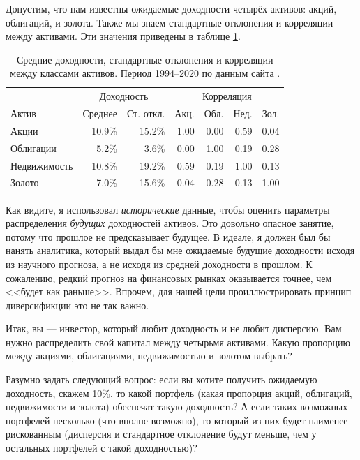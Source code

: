 Допустим, что нам известны ожидаемые доходности четырёх активов: акций, облигаций,  и золота. Также мы знаем стандартные отклонения и корреляции между активами. Эти значения приведены в таблице \ref{asset_class_returns_table}.

\begin{table}[h!]
\centering
\begin{tabular}{l|r|r|r|r|r|r}
 & \multicolumn{2}{c|}{Доходность} & \multicolumn{4}{c}{Корреляция} \\ \cline{2-7}
Актив        & Среднее & Ст. откл. & Акц. & Обл. & Нед. & Зол. \\ \hline
Акции        & 10.9\%  & 15.2\%    & 1.00  & 0.00   & 0.59    & 0.04 \\
Облигации    & 5.2\%   & 3.6\%     & 0.00  & 1.00   & 0.19    & 0.28 \\
Недвижимость & 10.8\%  & 19.2\%    & 0.59  & 0.19   & 1.00    & 0.13 \\
Золото       & 7.0\%   & 15.6\%    & 0.04  & 0.28   & 0.13    & 1.00
\end{tabular}
\caption{Средние доходности, стандартные отклонения и корреляции между классами активов. Период 1994--2020 по данным сайта .}
\label{asset_class_returns_table}
\end{table}

Как видите, я использовал \emph{исторические} данные, чтобы оценить параметры распределения \emph{будущих} доходностей активов. Это довольно опасное занятие, потому что прошлое не предсказывает будущее. В идеале, я должен был бы нанять аналитика, который выдал бы мне ожидаемые будущие доходности исходя из научного прогноза, а не исходя из средней доходности в прошлом. К сожалению, редкий прогноз на финансовых рынках оказывается точнее, чем <<будет как раньше>>. Впрочем, для нашей цели проиллюстрировать принцип диверсификции это не так важно.

Итак, вы --- инвестор, который любит доходность и не любит дисперсию. Вам нужно распределить свой капитал между четырьмя активами. Какую пропорцию между акциями, облигациями, недвижимостью и золотом выбрать?

Разумно задать следующий вопрос: если вы хотите получить ожидаемую доходность, скажем 10\%, то какой портфель (какая пропорция акций, облигаций, недвижимости и золота) обеспечат такую доходность? А если таких возможных портфелей несколько (что вполне возможно), то который из них будет наименее рискованным (дисперсия и стандартное отклонение будут меньше, чем у остальных портфелей с такой доходностью)?

